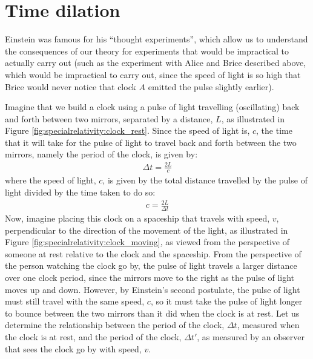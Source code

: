 \section{Time dilation}
Einstein was famous for his ``thought experiments'', which allow us to understand the consequences of our theory for experiments that would be impractical to actually carry out (such as the experiment with Alice and Brice described above, which would be impractical to carry out, since the speed of light is so high that Brice would never notice that clock $A$ emitted the pulse slightly earlier). 

Imagine that we build a clock using a pulse of light travelling (oscillating) back and forth between two mirrors, separated by a distance, $L$, as illustrated in Figure \ref{fig:specialrelativity:clock_rest}.
Since the speed of light is, $c$, the time that it will take for the pulse of light to travel back and forth between the two mirrors, namely the period of the clock, is given by:
\begin{align*}
\Delta t = \frac{2L}{c}
\end{align*}
where the speed of light, $c$, is given by the total distance travelled by the pulse of light divided by the time taken to do so:
\begin{align*}
c=\frac{2L}{\Delta t}
\end{align*}
Now, imagine placing this clock on a spaceship that travels with speed, $v$, perpendicular to the direction of the movement of the light, as illustrated in Figure \ref{fig:specialrelativity:clock_moving}, as viewed from the perspective of someone at rest relative to the clock and the spaceship.
From the perspective of the person watching the clock go by, the pulse of light travels a larger distance over one clock period, since the mirrors move to the right as the pulse of light moves up and down. However, by Einstein's second postulate, the pulse of light must still travel with the same speed, $c$, so it must take the pulse of light longer to bounce between the two mirrors than it did when the clock is at rest. Let us determine the relationship between the period of the clock, $\Delta t$, measured when the clock is at rest, and the period of the clock, $\Delta t'$, as measured by an observer that sees the clock go by with speed, $v$. 

